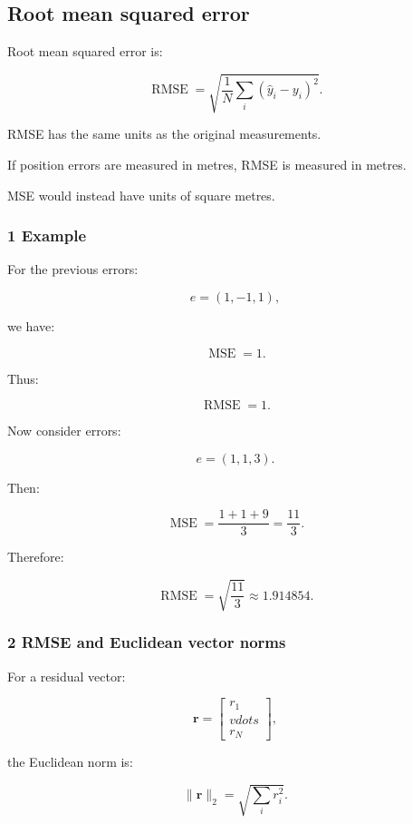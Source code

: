 \subsection{Root mean squared error}\label{02-foundations-ii-ch030-root-mean-squared-error}

Root mean squared error is:

\[
 \boxed{ \operatorname{RMSE} = \sqrt{ \frac1N\sum_i(\hat y_i-y_i)^2 } }.
\]

RMSE has the same units as the original measurements.

If position errors are measured in metres, RMSE is measured in metres.

MSE would instead have units of square metres.

\subsubsection{1 Example}\label{02-foundations-ii-ch030-example}

For the previous errors:

\[
 e=(1,-1,1),
\]

we have:

\[
 \operatorname{MSE}=1.
\]

Thus:

\[
 \boxed{\operatorname{RMSE}=1}.
\]

Now consider errors:

\[
 e=(1,1,3).
\]

Then:

\[
 \operatorname{MSE} = \frac{1+1+9}{3} =\frac{11}{3}.
\]

Therefore:

\[
 \boxed{ \operatorname{RMSE} = \sqrt{\frac{11}{3}} \approx1.914854 }.
\]

\subsubsection{2 RMSE and Euclidean vector norms}\label{02-foundations-ii-ch030-rmse-and-euclidean-vector-norms}

For a residual vector:

\[
 \mathbf r= \begin{bmatrix} r_1\\vdots\\r_N \end{bmatrix},
\]

the Euclidean norm is:

\[
 \|\mathbf r\|_2= \sqrt{\sum_i r_i^2}.
\]


